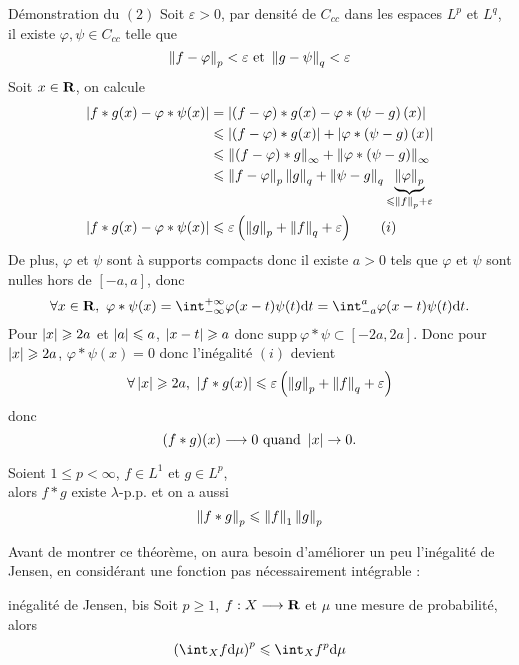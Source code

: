 \documentclass[a4paper,11pt, twoside]{article}
\begin{document}
\begin{ProofC}{Démonstration du $(\mathit 2)$}
  Soit $\varepsilon>0$, par densité de $C_{cc}$ dans les espaces $L^p$ et $L^q$, il existe $\varphi,\psi\in C_{cc}$ telle que 
  $$\left\lVert f-\varphi\right\rVert_p<\varepsilon\text{ et }\left\lVert g-\psi\right\rVert_q<\varepsilon$$
  Soit $x\in\mathbf R$, on calcule 
  \begin{align*}
    \left| f*g(x)-\varphi*\psi(x)\right|&=\left| \left(f-\varphi\right)*g(x)-\varphi*\left(\psi-g\right)(x)\right|\\
    &\leqslant\left| \left(f-\varphi\right)*g(x)\right|+\left| \varphi*\left(\psi-g\right)(x)\right|\\
    &\leqslant\left\lVert\left(f-\varphi\right)*g\right\rVert_\infty+\left\lVert\varphi*\left(\psi-g\right)\right\rVert_\infty\\
    &\leqslant\left\lVert f-\varphi\right\rVert_p\left\lVert g\right\rVert_q+\left\lVert\psi-g\right\rVert_q\underbrace{\left\lVert\varphi\right\rVert_p}_{\leqslant \left\lVert f\right\rVert_p+\varepsilon}\\
    \left| f*g(x)-\varphi*\psi(x)\right|&\leqslant \varepsilon\left(\left\lVert g\right\rVert_p+\left\lVert f\right\rVert_q+\varepsilon\right)\qquad (i)
  \end{align*}
  De plus, $\varphi$ et $\psi$ sont à supports compacts donc il existe $a>0$ tels que $\varphi$ et $\psi$ sont nulles hors de $[-a,a]$, donc
  $$\forall x\in\R,\ \varphi*\psi(x)=\intr\varphi(x-t)\psi(t)\dt=\int_{-a}^a\varphi(x-t)\psi(t)\dt.$$
  Pour $\left| x\right|\geqslant 2a$ et $\left| a\right|\leqslant a$, $\left| x-t\right|\geqslant a$ donc $\mathrm{supp}\ \varphi*\psi\subset[-2a,2a].$
  Donc pour $\left| x\right|\geqslant 2a$, $\varphi*\psi(x)=0$ donc l'inégalité $(i)$ devient 
  $$\forall \abs x\geqslant 2a,\ \abs{f*g(x)}\leqslant \varepsilon\Par{\norm{g}_p+\norm{f}_q+\varepsilon}$$
  donc 
  $$(f*g)(x)\longrightarrow 0\text{ quand }\left| x\right|\to 0.$$
\end{ProofC}


\begin{Th}
  Soient $1\leqslant p<\infty$, $f\in L^1$ et $g\in L^p$,\\

  alors $f*g$ existe $\lambda$-p.p. et on a aussi
  $$\left\lVert f*g\right\rVert_p\leqslant \left\lVert f\right\rVert_1\left\lVert g\right\rVert_p$$
\end{Th}


Avant de montrer ce théorème, on aura besoin d'améliorer un peu l'inégalité de Jensen, en considérant une fonction pas nécessairement intégrable :


\begin{propC}{inégalité de Jensen, bis}
  Soit $p\geqslant 1$, $f:X\longrightarrow\mathbf R$ et $\mu$ une mesure de probabilité,\\

  alors 
  $$\Par{\int_Xf\dmu}^p\leqslant\int_Xf^p\dmu$$
\end{propC}
\end{document}
